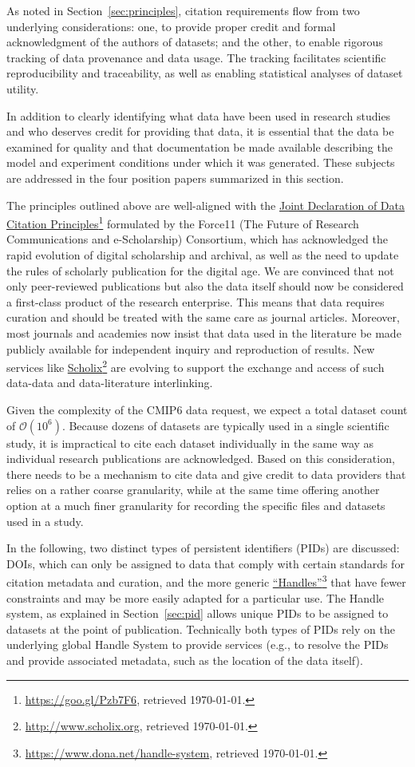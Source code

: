 \documentclass[gmd,manuscript]{copernicus}
\newcommand{\urlref}[2] {\href{#1}{#2}\footnote{\url{#1}, retrieved \today.}}
\begin{document}
As noted in Section~\ref{sec:principles}, citation requirements flow
from two underlying considerations: one, to provide proper credit and
formal acknowledgment of the authors of datasets; and the other, to
enable rigorous tracking of data provenance and data usage. The
tracking facilitates scientific reproducibility and traceability, as
well as enabling statistical analyses of dataset utility.

In addition to clearly identifying what data have been used in
research studies and who deserves credit for providing that data, it
is essential that the data be examined for quality and that
documentation be made available describing the model and experiment
conditions under which it was generated. These subjects are addressed
in the four position papers summarized in this section.

The principles outlined above are well-aligned with the
\urlref{https://goo.gl/Pzb7F6}{Joint Declaration of Data Citation
Principles} formulated by the Force11 (The Future of Research
Communications and e-Scholarship) Consortium, which has acknowledged
the rapid evolution of digital scholarship and archival, as well as
the need to update the rules of scholarly publication for the digital
age. We are convinced that not only peer-reviewed publications but
also the data itself should now be considered a first-class product of
the research enterprise. This means that data requires curation and
should be treated with the same care as journal articles. Moreover,
most journals and academies now insist that data used in the
literature be made publicly available for independent inquiry and
reproduction of results. New services like
\urlref{http://www.scholix.org}{Scholix} are evolving to support the
exchange and access of such data-data and data-literature
interlinking.

Given the complexity of the CMIP6 data request, we expect
 a total dataset count of $\mathcal{O}(10^6)$.
Because dozens of datasets are typically used in a single scientific
study, it is impractical to cite each dataset individually in the same
way as individual research publications are acknowledged. Based on
this consideration, there needs to be a mechanism to cite data
and give credit to data providers that relies on a rather coarse
granularity, while at the same time offering another option at a much
finer granularity for recording the specific files and datasets used
in a study.

In the following, two distinct types of persistent identifiers (PIDs)
are discussed: DOIs, which can only be assigned to data that comply
with certain standards for citation metadata and curation, and the
more generic
\urlref{https://www.dona.net/handle-system}{``Handles''} that have
fewer constraints and may be more easily adapted for a particular use.
The Handle system, as explained in Section~\ref{sec:pid} allows
unique PIDs to be assigned to datasets at the point of publication.
Technically both types of PIDs rely on the underlying global Handle
System to provide services (e.g., to resolve the PIDs and provide
associated metadata, such as the location of the data itself).
\end{document}
